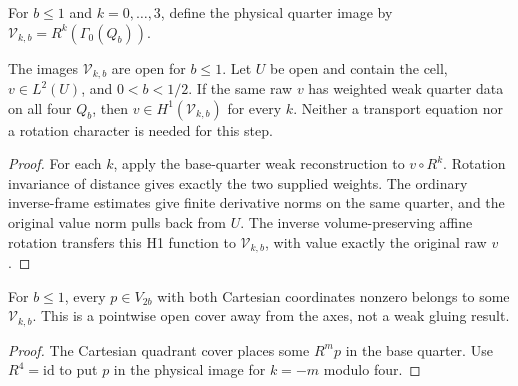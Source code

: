 \begin{definition}
\label{def:rotated-quarter-image}
\leanok
For $b\le1$ and $k=0,\ldots,3$, define the physical quarter image by
$\mathcal V_{k,b}=R^k(\Gamma_0(Q_b))$.
\end{definition}

\begin{lemma}
\label{lem:weighted-quarter-physical-h1}
\leanok
The images $\mathcal V_{k,b}$ are open for $b\le1$.
Let $U$ be open and contain the cell, $v\in L^2(U)$, and $0<b<1/2$.
If the same raw $v$ has weighted weak quarter data on all four $Q_b$,
then $v\in H^1(\mathcal V_{k,b})$ for every $k$.
Neither a transport equation nor a rotation character is needed for this step.
\end{lemma}

\begin{proof}
\leanok
For each $k$, apply the base-quarter weak reconstruction to $v\circ R^k$.
Rotation invariance of distance gives exactly the two supplied weights.
The ordinary inverse-frame estimates give finite derivative norms on the same
quarter, and the original value norm pulls back from $U$.
The inverse volume-preserving affine rotation transfers this H1 function
to $\mathcal V_{k,b}$, with value exactly the original raw $v$.
\end{proof}

\begin{lemma}
\label{lem:rotated-quarter-point-cover}
\leanok
For $b\le1$, every $p\in V_{2b}$ with both Cartesian coordinates nonzero
belongs to some $\mathcal V_{k,b}$.
This is a pointwise open cover away from the axes, not a weak gluing result.
\end{lemma}

\begin{proof}
\leanok
The Cartesian quadrant cover places some $R^m p$ in the base quarter.
Use $R^4=\mathrm{id}$ to put $p$ in the physical image for $k=-m$ modulo four.
\end{proof}

